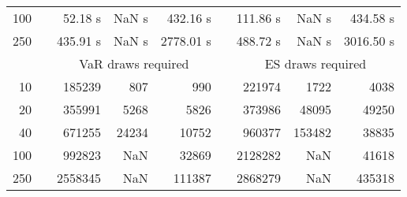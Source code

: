 {{\begin{longtable}{rr rrr r rrr}
100 & & 52.18 s &  NaN s & 432.16 s && 111.86 s &  NaN s & 434.58 s \\ 
250 & & 435.91 s &  NaN s & 2778.01 s && 488.72 s &  NaN s & 3016.50 s \\ 
\hline 
 && \multicolumn{3}{c}{VaR draws required} &&   \multicolumn{3}{c}{ES draws required} \\  \cline{3-5}  \cline{7-9} 
10 & & 185239 & 807 & 990 && 221974 & 1722 & 4038 \\ 
20 & & 355991 & 5268 & 5826 && 373986 & 48095 & 49250 \\ 
40 & & 671255 & 24234 & 10752 && 960377 & 153482 & 38835 \\ 
100 & & 992823 & NaN & 32869 && 2128282 & NaN & 41618 \\ 
250 & & 2558345 & NaN & 111387 && 2868279 & NaN & 435318 \\ 
\hline 
\end{longtable} 
} 
} 
